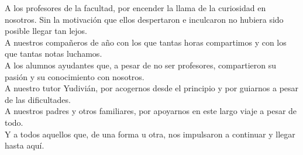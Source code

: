 \begin{acknowledgements}
	A los profesores de la facultad, por encender la llama de la curiosidad en nosotros. Sin la motivación
	que ellos despertaron e inculcaron no hubiera sido posible llegar tan lejos.\\

	A nuestros compañeros de año con los que tantas horas compartimos y con los que tantas notas luchamos.\\


	A los alumnos ayudantes que, a pesar de no ser profesores, compartieron su pasión y su conocimiento con 
	nosotros.\\

	A nuestro tutor Yudivián, por acogernos desde el principio y por guiarnos a pesar de las dificultades.\\


	A nuestros padres y otros familiares, por apoyarnos en este largo viaje a pesar de todo.\\


	Y a todos aquellos que, de una forma u otra, nos impulsaron a continuar y llegar hasta aquí.
\end{acknowledgements}
